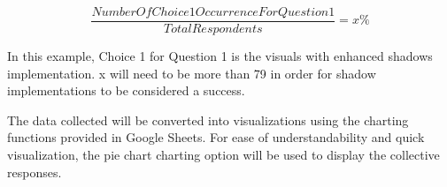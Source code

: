 \documentclass[10pt,journal,compsoc,draftclsnofoot]{IEEEtran}
\begin{document}
\begin{flushleft}
\begin{equation}
\frac{Number Of Choice 1 Occurrence For Question 1}{Total Respondents} = x\%
\end{equation}

\vspace{3mm}
In this example, Choice 1 for Question 1 is the visuals with enhanced shadows implementation. 
x will need to be more than 79 in order for shadow implementations to be considered a success.

The data collected will be converted into visualizations using the charting functions provided in Google Sheets. 
For ease of understandability and quick visualization, the pie chart charting option will be used to display the collective responses. 

\end{flushleft}
\end{document}

